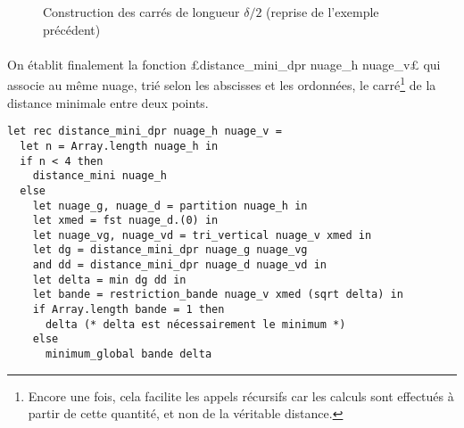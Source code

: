 \documentclass{article}
\begin{document}
  \begin{figure}[h]
    \begin{center}
    \end{center}
    \caption{Construction des carrés de longueur $\delta/2$ (reprise de l'exemple précédent)}\label{carres}
  \end{figure}

  \paragraph{} On établit finalement la fonction £distance_mini_dpr nuage_h nuage_v£ qui associe au même nuage, trié selon les abscisses et les ordonnées, le carré\footnote{Encore une fois, cela facilite les appels récursifs car les calculs sont effectués à partir de cette quantité, et non de la véritable distance.} de la distance minimale entre deux points.

  \begin{lstlisting}
let rec distance_mini_dpr nuage_h nuage_v =
  let n = Array.length nuage_h in
  if n < 4 then
    distance_mini nuage_h
  else
    let nuage_g, nuage_d = partition nuage_h in
    let xmed = fst nuage_d.(0) in
    let nuage_vg, nuage_vd = tri_vertical nuage_v xmed in
    let dg = distance_mini_dpr nuage_g nuage_vg
    and dd = distance_mini_dpr nuage_d nuage_vd in
    let delta = min dg dd in
    let bande = restriction_bande nuage_v xmed (sqrt delta) in
    if Array.length bande = 1 then
      delta (* delta est nécessairement le minimum *)
    else
      minimum_global bande delta
  \end{lstlisting}
\end{document}
